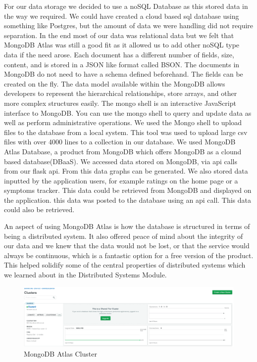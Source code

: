 For our data storage we decided to use a noSQL Database as this stored data in the way we required. We could have created a cloud based sql database using something like Postgres, but the amount of data we were handling did not require separation.
In the end most of our data was relational data but we felt that MongoDB Atlas was still a good fit as it allowed us to add other noSQL type data if the need arose. Each document has a different number of fields, size, content, and is stored in a JSON like format called BSON. The documents in MongoDB do not need to have a schema defined beforehand. The fields can be created on the fly. The data model available within the MongoDB allows developers to represent the hierarchical relationships, store arrays, and other more complex structures easily.
The mongo shell is an interactive JavaScript interface to MongoDB. You can use the mongo shell to query and update data as well as perform administrative operations.\cite{mongodb}
We used the Mongo shell to upload files to the database from a local system. This tool was used to upload large csv files  with over 4000 lines to a collection in our database.
We used MongoDB Atlas Database, a product from MongoDB which offers MongoDB as a clound based database(DBaaS). We accessed data stored on MongoDB, via api calls from our flask api. From this data graphs can be generated. We also stored data inputted by the application users, for example ratings on the home page or a symptoms tracker. This data could be retrieved from MongoDB and displayed on the application.
this data was posted to the database using an api call. This data could also be retrieved.\\
\vspace{2mm}

An aspect of using MongoDB Atlas is how the database is structured in terms of being a distributed system. It also offered peace of mind about the integrity of our data and we knew that the data would not be lost, or that the service would always be continuous, which is a fantastic option for a free version of the product.
This helped solidify  some of the central properties of distributed systems which we learned about in the Distributed Systems Module.

\begin{figure}[H]
    \centering
    \includegraphics[scale=0.35]{img/clusterDB.PNG}
    \caption{MongoDB Atlas Cluster}
    \label{fig:my_label04}
\end{figure}


